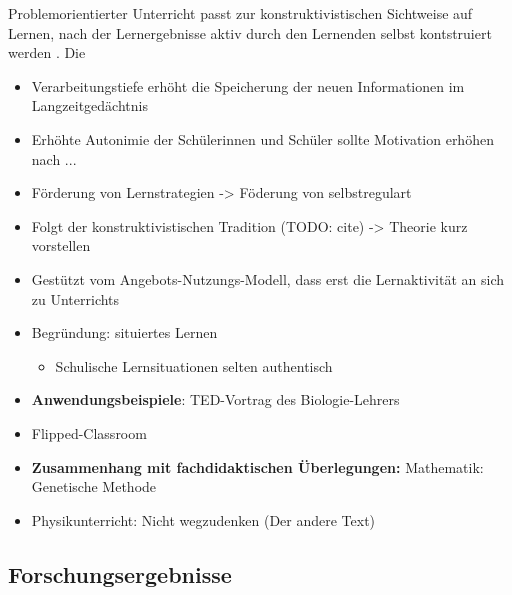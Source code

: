 \documentclass[man,12pt,a4paper]{apa6}
\begin{document}
Problemorientierter Unterricht passt zur konstruktivistischen Sichtweise auf Lernen, nach der Lernergebnisse aktiv durch den Lernenden selbst kontstruiert werden \parencite{reiss2012}. Die 

\begin{itemize}
  \item Verarbeitungstiefe erhöht die Speicherung der neuen Informationen im Langzeitgedächtnis\cite{seidel2014}
  \item Erhöhte Autonimie der Schülerinnen und Schüler sollte Motivation erhöhen nach ...
  \item Förderung von Lernstrategien -> Föderung von selbstregulart
  \item Folgt der konstruktivistischen Tradition (TODO: cite) -> Theorie kurz vorstellen
  \item Gestützt vom Angebots-Nutzungs-Modell, dass erst die Lernaktivität an sich zu Unterrichts
  \item Begründung: situiertes Lernen \cite{reusser2005}

    \begin{itemize}
      \item Schulische Lernsituationen selten authentisch
    \end{itemize}

  \item \textbf{Anwendungsbeispiele}: TED-Vortrag des Biologie-Lehrers
  \item Flipped-Classroom

  \item \textbf{Zusammenhang mit fachdidaktischen Überlegungen:} Mathematik: Genetische Methode
  \item Physikunterricht: Nicht wegzudenken (Der andere Text)
\end{itemize}

\subsection{Forschungsergebnisse}
\end{document}
